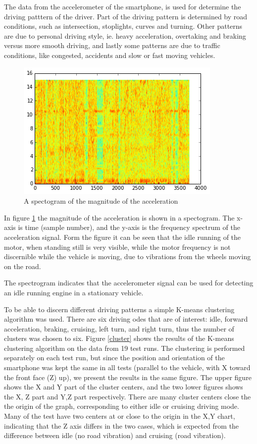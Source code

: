 The data from the accelerometer of the smartphone, is used for determine the driving patttern of the driver. Part of the driving pattern is determined by road conditions, such as intersection, stoplights, curves and turning. Other patterns are due to personal driving style, ie. heavy acceleration, overtaking and braking versus more smooth driving, and lastly some patterns are due to traffic conditions, like congested, accidents and slow or fast moving vehicles.
\begin{figure}[h]
  \includegraphics[scale=0.5]{specgram}
  \caption{A spectogram of the magnitude of the acceleration}
  \label{spectogram}
\end{figure}
In figure \ref{spectogram} the magnitude of the acceleration is shown in a spectogram. The x-axis is time (sample number), and the y-axis is the frequency spectrum of the acceleration signal. Form the figure it can be seen that the idle running of the motor, when standing still is very visible, while the motor frequency is not discernible while the vehicle is moving, due to vibrations from the wheels moving on the road.

The spectrogram indicates that the accelerometer signal can be used for detecting an idle running engine in a stationary vehicle.

To be able to discern different driving patterns a simple K-means clustering algorithm was used. There are six driving odes that are of interest: idle, forward acceleration, braking, cruising, left turn, and right turn, thus the number of clusters was chosen to six. Figure \ref{cluster} shows the results of the K-means clustering algorithm on the data from 19 test runs. The clustering is performed separately on each test run, but since the position and orientation of the smartphone was kept the same in all tests (parallel to the vehicle, with X toward the front face (Z) up), we present the results in the same figure. The upper figure shows the X and Y part of the cluster centers, and the two lower figures shows the X, Z part and Y,Z part respectively. There are many cluster centers close the the origin of the graph, corresponding to either idle or cruising driving mode. Many of the test have two centers at or close to the origin in the X,Y chart, indicating that the Z axis differs in the two cases, which is expected from the difference between idle (no road vibration) and cruising (road vibration).

